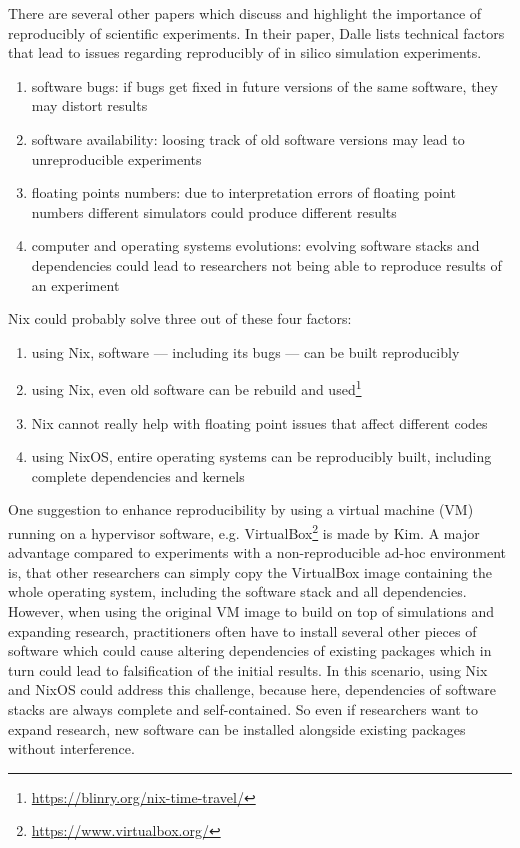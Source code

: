 \documentclass[conference,final,a4paper]{IEEEtran}
\begin{document}
There are several other papers which discuss and highlight the importance of reproducibly of scientific experiments.
In their paper, Dalle lists technical factors that lead to issues regarding reproducibly of in silico simulation experiments.\cite{Dalle_2012}
\begin{enumerate}
    \item software bugs: if bugs get fixed in future versions of the same software, they may distort results
    \item software availability: loosing track of old software versions may lead to unreproducible experiments
    \item floating points numbers: due to interpretation errors of floating point numbers different simulators could produce different results
    \item computer and operating systems evolutions: evolving software stacks and dependencies could lead to researchers not being able to reproduce results of an experiment
\end{enumerate}
Nix could probably solve three out of these four factors:
\begin{enumerate}
    \item using Nix, software --- including its bugs --- can be built reproducibly
    \item using Nix, even old software can be rebuild and used\footnote{\url{https://blinry.org/nix-time-travel/}}
    \item Nix cannot really help with floating point issues that affect different codes
    \item using NixOS, entire operating systems can be reproducibly built, including complete dependencies and kernels
\end{enumerate}

One suggestion to enhance reproducibility by using a virtual machine (VM) running on a hypervisor software, e.g. VirtualBox\footnote{\url{https://www.virtualbox.org/}} is made by Kim.\cite{Kim_2019}
A major advantage compared to experiments with a non-reproducible ad-hoc environment is, that other researchers can simply copy the VirtualBox image containing the whole operating system, including the software stack and all dependencies.
However, when using the original VM image to build on top of simulations and expanding research, practitioners often have to install several other pieces of software which could cause altering dependencies of existing packages which in turn could lead to falsification of the initial results.
In this scenario, using Nix and NixOS could address this challenge, because here, dependencies of software stacks are always complete and self-contained.
So even if researchers want to expand research, new software can be installed alongside existing packages without interference.
\end{document}
